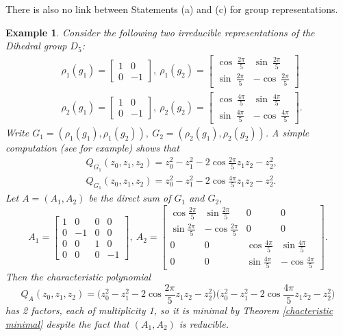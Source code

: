 \documentclass[draft, 12pt, reqno]{amsart}
\numberwithin{equation}{section}
\theoremstyle{plain}
\newtheorem{example}[theorem]{Example}
\begin{document}
There is also no link between Statements (a) and (c) for group representations.
\begin{example}\normalfont
Consider
the following two irreducible representations of the Dihedral group $D_5$:
\begin{eqnarray*}
&\rho_1(g_1)=\left [ \begin{array}{cc} 1&0\\0&-1\end{array} \right ]	, \ \rho_1(g_2)=\left [\begin{array}{cc} \cos \ \frac{2\pi }{5}& \sin \ \frac{2\pi }{5}\\ \sin \ \frac{2\pi }{5} & -\cos \ \frac{2\pi }{5} \end{array} \right ] \\
& \rho_2(g_1)=\left [ \begin{array}{cc} 1&0\\0&-1\end{array} \right ],  \ \rho_2(g_2)=\left [\begin{array}{cc} \cos \ \frac{4\pi }{5}& \sin \ \frac{4\pi }{5}\\ \sin \ \frac{4\pi }{5} & -\cos \ \frac{4\pi }{5} \end{array} \right ]. 
\end{eqnarray*}
Write $G_1=(\rho_1(g_1),\rho_1(g_2)), \  G_2=(\rho_2(g_1),\rho_2(g_2)) $.  A simple computation (see \cite{CST} for example) shows that 
\begin{eqnarray*}
&Q_{G_1}(z_0,z_1,z_2)=z_0^2-z_1^2-2\cos \frac{2\pi }{5}z_1z_2-z_2^2, \\
&Q_{G_1}(z_0,z_1,z_2)=z_0^2-z_1^2-2\cos \frac{4\pi }{5}z_1z_2-z_2^2.	
\end{eqnarray*}
Let $A=(A_1,A_2)$ be the direct sum of $G_1$ and $G_2$,
\small\begin{equation}\label{from dihedral}
A_1=\left [ \begin{array}{cccc} 1& 0&0&0 \\ 0&-1&0&0\\0&0&1&0 \\0&0&0&-1\end{array}\right ], \ A_2=\left [ \begin{array}{cccc} \cos \frac{2\pi }{5}& \sin \frac{2\pi }{5}&0&0 \\ \sin \frac{2\pi}{5}&-\cos \frac{2\pi }{5}&0&0\\0&0&\cos \frac{4\pi }{5}&\sin \frac{4\pi }{5} \\0&0&\sin \frac{4\pi }{5}&-\cos \frac{4\pi }{5}\end{array}\right ].
 \end{equation}\normalsize
 Then the characteristic polynomial
 $$Q_A(z_0,z_1,z_2)=\big(z_0^2-z_1^2-2\cos \frac{2\pi }{5}z_1z_2-z_2^2\big)\big(z_0^2-z_1^2-2\cos \frac{4\pi }{5}z_1z_2-z_2^2\big) $$
 has 2 factors, each of multiplicity 1, so it is minimal by Theorem \ref{chacteristic minimal} despite the fact that $(A_1,A_2)$ is reducible. 
 \end{example}
\end{document}
